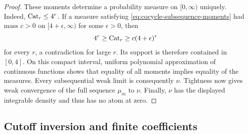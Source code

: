 \begin{proof}
These moments determine a probability measure on
$[0,\infty)$ uniquely.
Indeed, $\operatorname{Cat}_r\leq 4^r$.  If a measure satisfying
\eqref{eq:cocycle-subsequence-moments} had mass $c>0$ on
$[4+\epsilon,\infty)$ for some $\epsilon>0$, then
\[
  4^r\geq\operatorname{Cat}_r\geq c(4+\epsilon)^r
\]
for every $r$, a contradiction for large $r$.
Its support is therefore contained in $[0,4]$.
On this compact interval, uniform polynomial approximation of
continuous functions shows that equality of all moments implies
equality of the measures.
Every subsequential weak limit is consequently $\nu$.
Tightness now gives weak convergence of the full sequence
$\mu_m$ to $\nu$.
Finally, $\nu$ has the displayed integrable density and thus has
no atom at zero.
\end{proof}

\subsection{Cutoff inversion and finite coefficients}




